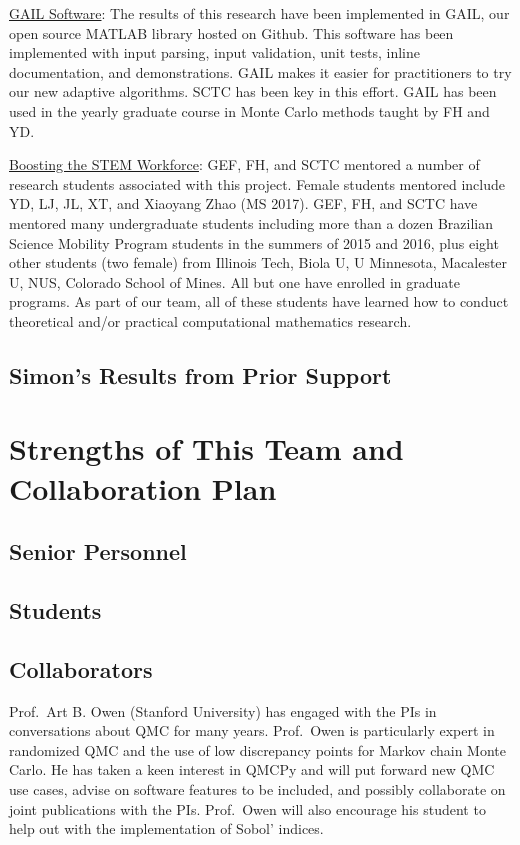 \documentclass[11pt]{NSFamsart}
\newcommand{\Upara}[1]{\noindent\underline{#1}:\xspace}
\newcommand{\GAIL}{GAIL\xspace}
\newcommand{\MATLAB}{MATLAB\xspace}
\newcommand{\Rlang}{R\xspace}
\begin{document}
\Upara{\GAIL Software} The results of this research have been implemented in 
\GAIL, our open source \MATLAB library hosted on
Github. This software 
has been implemented with input parsing, input validation, unit tests, inline documentation, and 
demonstrations.  \GAIL makes it easier for practitioners to try our new adaptive algorithms.  SCTC has been key in this effort.  \GAIL has been used in the yearly graduate course in Monte Carlo methods taught by FH and YD.  

\Upara{Boosting the STEM Workforce} GEF, FH, and SCTC mentored a number of 
research students associated with this project.  Female students mentored include YD, LJ, JL, XT, and Xiaoyang Zhao (MS 2017).   GEF, FH,  and SCTC have mentored many undergraduate students including more than a dozen 
Brazilian Science Mobility Program students in the summers of 2015 and 2016, plus eight other students (two female) from Illinois Tech, Biola U, U Minnesota, Macalester U, NUS, Colorado School of Mines.  All but one have enrolled in graduate programs.   As part of our team, all of
these students have learned how to conduct theoretical and/or practical computational mathematics research.

\subsection{Simon's Results from Prior Support}



\section{Strengths of This Team and Collaboration Plan}

\subsection{Senior Personnel}


\subsection{Students}


\subsection{Collaborators}
Prof.\ Art B. Owen (Stanford University) has engaged with the PIs in conversations about QMC for many years.  Prof.\ Owen is particularly expert in randomized QMC and the use of low discrepancy points for Markov chain Monte Carlo.  He has taken a keen interest in QMCPy and will put forward new QMC use cases, advise on software features to be included, and possibly collaborate on joint publications with the PIs.  Prof.\ Owen will also encourage his student to help out with the implementation of Sobol' indices.
\end{document}
